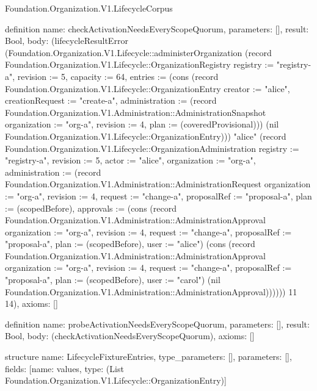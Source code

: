 \begin{lexlean}{Foundation.Organization.V1.LifecycleCorpus}
\begin{semanticmodule}
definition{
  name: checkActivationNeedsEveryScopeQuorum,
  parameters: [],
  result: Bool,
  body: (lifecycleResultError (Foundation.Organization.V1.Lifecycle::administerOrganization (record Foundation.Organization.V1.Lifecycle::OrganizationRegistry {registry := "registry-a", revision := 5, capacity := 64, entries := (cons (record Foundation.Organization.V1.Lifecycle::OrganizationEntry {creator := "alice", creationRequest := "create-a", administration := (record Foundation.Organization.V1.Administration::AdministrationSnapshot {organization := "org-a", revision := 4, plan := (coveredProvisional)})}) (nil Foundation.Organization.V1.Lifecycle::OrganizationEntry))}) "alice" (record Foundation.Organization.V1.Lifecycle::OrganizationAdministration {registry := "registry-a", revision := 5, actor := "alice", organization := "org-a", administration := (record Foundation.Organization.V1.Administration::AdministrationRequest {organization := "org-a", revision := 4, request := "change-a", proposalRef := "proposal-a", plan := (scopedBefore), approvals := (cons (record Foundation.Organization.V1.Administration::AdministrationApproval {organization := "org-a", revision := 4, request := "change-a", proposalRef := "proposal-a", plan := (scopedBefore), user := "alice"}) (cons (record Foundation.Organization.V1.Administration::AdministrationApproval {organization := "org-a", revision := 4, request := "change-a", proposalRef := "proposal-a", plan := (scopedBefore), user := "carol"}) (nil Foundation.Organization.V1.Administration::AdministrationApproval)))})})) 11 14),
  axioms: []
}

definition{
  name: probeActivationNeedsEveryScopeQuorum,
  parameters: [],
  result: Bool,
  body: (checkActivationNeedsEveryScopeQuorum),
  axioms: []
}

structure{
  name: LifecycleFixtureEntries,
  type_parameters: [],
  parameters: [],
  fields: [{name: values, type: (List Foundation.Organization.V1.Lifecycle::OrganizationEntry)}]
}


\end{semanticmodule}
\end{lexlean}
